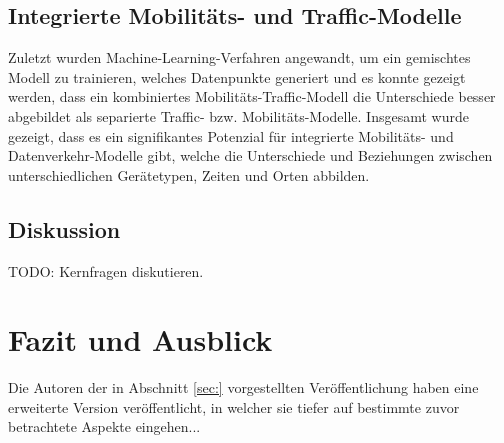 \documentclass[12pt, a4paper]{article}
\begin{document}
\subsection{Integrierte Mobilitäts- und Traffic-Modelle}

Zuletzt wurden Machine-Learning-Verfahren angewandt, um ein gemischtes Modell zu trainieren, welches Datenpunkte
generiert und es konnte gezeigt werden, dass ein kombiniertes Mobilitäts-Traffic-Modell die Unterschiede besser abgebildet
als separierte Traffic- bzw. Mobilitäts-Modelle.\newline
Insgesamt wurde gezeigt, dass es ein signifikantes Potenzial für integrierte Mobilitäts- und Datenverkehr-Modelle gibt,
welche die Unterschiede und Beziehungen zwischen unterschiedlichen Gerätetypen, Zeiten und Orten abbilden.

\subsection{Diskussion}

TODO: Kernfragen diskutieren.

\pagebreak

\section{Fazit und Ausblick}

Die Autoren der in Abschnitt \ref{sec:} vorgestellten Veröffentlichung haben eine erweiterte Version veröffentlicht,
in welcher sie tiefer auf bestimmte zuvor betrachtete Aspekte eingehen...


%

\end{document}
